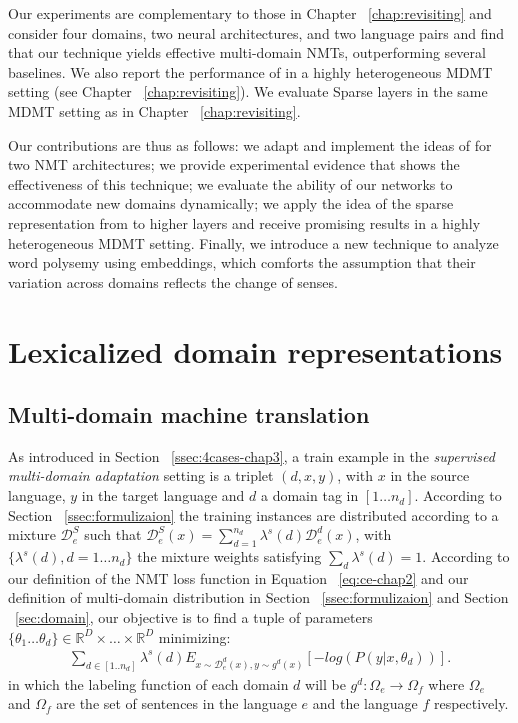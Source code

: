Our experiments are complementary to those in Chapter ~\ref{chap:revisiting} and consider four domains, two neural architectures, and two language pairs and find that our technique yields effective multi-domain NMTs, outperforming several baselines. We also report the performance of  in a highly heterogeneous MDMT setting (see Chapter ~\ref{chap:revisiting}). We evaluate Sparse layers in the same MDMT setting as in Chapter ~\ref{chap:revisiting}.

Our contributions are thus as follows: we adapt and implement the ideas of \citet{Daume07frustratingly} for two NMT architectures; we provide experimental evidence that shows the effectiveness of this technique; we evaluate the ability of our networks to accommodate new domains dynamically; we apply the idea of the sparse representation from  to higher layers and receive promising results in a highly heterogeneous MDMT setting. Finally, we introduce a new technique to analyze word polysemy using embeddings, which comforts the assumption that their variation across domains reflects the change of senses.

\section{Lexicalized domain representations\label{sec:lexicalized_embeddings-chap5}}
\subsection{Multi-domain machine translation \label{ssec:statement-chap5}}
As introduced in Section ~\ref{ssec:4cases-chap3}, a train example in the \emph{supervised multi-domain adaptation} setting is a triplet $(d,x,y)$, with $x$ in the source language, $y$ in the target language and $d$ a domain tag in $[1\dots n_d]$. According to Section ~\ref{ssec:formulizaion} the training instances are distributed according to a mixture $\mathcal{D}_e^S$ such that $\mathcal{D}_e^S(x) = \sum_{d=1}^{n_d} \lambda^{s}(d) \mathcal{D}_e^d(x)$, with $\{\lambda^{s}(d), d=1 \dots n_d\}$ the mixture weights satisfying $\sum_d \lambda^{s}(d)=1$. According to our definition of the NMT loss function in Equation ~\eqref{eq:ce-chap2} and our definition of multi-domain distribution in Section ~\ref{ssec:formulizaion} and Section ~\ref{sec:domain}, our objective is to find a tuple of parameters $\{\theta_1 \dots \theta_d \} \in \mathbb{R}^D \times \dots \times \mathbb{R}^D$ minimizing:
\begin{equation} \label{eq:loss-chap5}
\begin{split}
\sum_{d \in [1..n_d]} \lambda^{s}(d) E_{x \sim \mathcal{D}_e^d(x), y \sim g^d(x)} [-log(P(y|x,\theta_d))] \text{.}
\end{split}
\end{equation}
in which the labeling function of each domain $d$ will be $g^d: \Omega_{e} \rightarrow \Omega_{f}$ where $\Omega_{e}$ and $\Omega_{f}$ are the set of sentences in the language $e$ and the language $f$ respectively.

